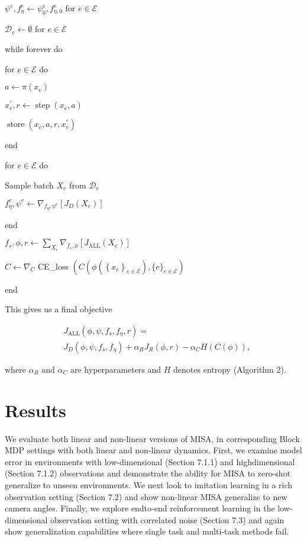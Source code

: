 \documentclass[10pt]{article}
\begin{document}
$\psi^{e}, f_{\eta}^{e} \leftarrow \psi_{0}^{e}, f_{\eta, 0}^{e}$ for $e \in \mathcal{E}$

$\mathcal{D}_{e} \leftarrow \emptyset$ for $e \in \mathcal{E}$

while forever do

for $e \in \mathcal{E}$ do

$a \leftarrow \pi\left(x_{e}\right)$

$x_{e}^{\prime}, r \leftarrow \operatorname{step}\left(x_{e}, a\right)$

$\operatorname{store}\left(x_{e}, a, r, x_{e}^{\prime}\right)$

end

for $e \in \mathcal{E}$ do

Sample batch $X_{e}$ from $\mathcal{D}_{e}$

$f_{\eta}^{e}, \psi^{e} \leftarrow \nabla_{f_{\eta}, \psi^{e}}\left[J_{D}\left(X_{e}\right)\right]$

end

$f_{s}, \phi, r \leftarrow \sum_{X_{e}} \nabla_{f_{s}, \phi}\left[J_{\mathrm{ALL}}\left(X_{e}\right)\right]$

$C \leftarrow \nabla_{C}$ CE\_loss $\left(C\left(\phi\left(\left\{x_{e}\right\}_{e \in \mathcal{E}}\right),\{e\}_{e \in \mathcal{E}}\right)\right.$

end

This gives us a final objective

\[
\begin{aligned}
& J_{\mathrm{ALL}}\left(\phi, \psi, f_{s}, f_{\eta}, r\right)= \\
& J_{D}\left(\phi, \psi, f_{s}, f_{\eta}\right)+\alpha_{R} J_{R}(\phi, r)-\alpha_{C} H(C(\phi)),
\end{aligned}
\]

where $\alpha_{R}$ and $\alpha_{C}$ are hyperparameters and $H$ denotes entropy (Algorithm 2).

\section{Results}
We evaluate both linear and non-linear versions of MISA, in corresponding Block MDP settings with both linear and non-linear dynamics. First, we examine model error in environments with low-dimensional (Section 7.1.1) and highdimensional (Section 7.1.2) observations and demonstrate the ability for MISA to zero-shot generalize to unseen environments. We next look to imitation learning in a rich observation setting (Section 7.2) and show non-linear MISA generalize to new camera angles. Finally, we explore endto-end reinforcement learning in the low-dimensional observation setting with correlated noise (Section 7.3) and again show generalization capabilities where single task and multi-task methods fail.
\end{document}
